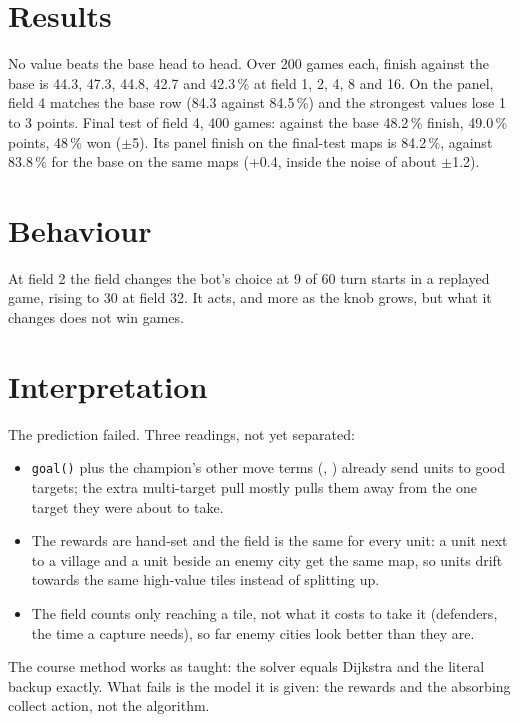 \documentclass{../polyexp}
\begin{document}
\section{Results}
\ExpResults

No value beats the base head to head. Over 200 games each, finish against the base is 44.3, 47.3, 44.8, 42.7 and 42.3\,\% at field 1, 2, 4, 8 and 16. On the panel, field 4 matches the base row (84.3 against 84.5\,\%) and the strongest values lose 1 to 3 points. Final test of field 4, 400 games: against the base 48.2\,\% finish, 49.0\,\% points, 48\,\% won ($\pm$5). Its panel finish on the final-test maps is 84.2\,\%, against 83.8\,\% for the base on the same maps (+0.4, inside the noise of about $\pm$1.2).

\section{Behaviour}
At field 2 the field changes the bot's choice at 9 of 60 turn starts in a replayed game, rising to 30 at field 32. It acts, and more as the knob grows, but what it changes does not win games.

\section{Interpretation}
The prediction failed. Three readings, not yet separated:
\begin{itemize}
\item \texttt{goal()} plus the champion's other move terms (, ) already send units to good targets; the extra multi-target pull mostly pulls them away from the one target they were about to take.
\item The rewards are hand-set and the field is the same for every unit: a unit next to a village and a unit beside an enemy city get the same map, so units drift towards the same high-value tiles instead of splitting up.
\item The field counts only reaching a tile, not what it costs to take it (defenders, the time a capture needs), so far enemy cities look better than they are.
\end{itemize}
The course method works as taught: the solver equals Dijkstra and the literal backup exactly. What fails is the model it is given: the rewards and the absorbing collect action, not the algorithm.

\end{document}
